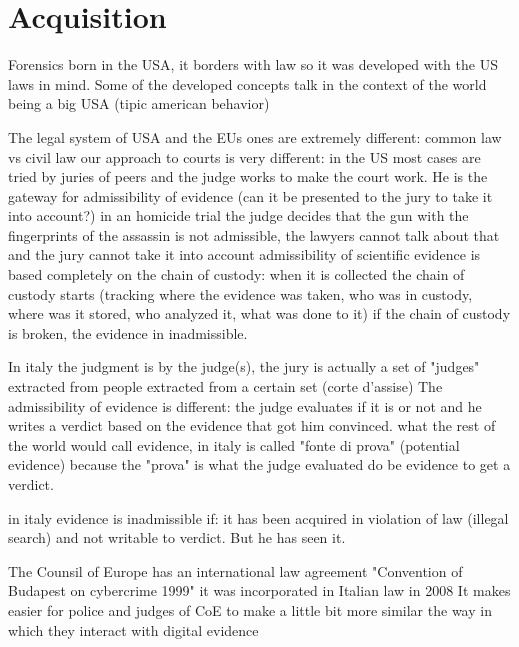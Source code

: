 \chapter{Acquisition}
    Forensics born in the USA, it borders with law so it was developed with the US laws in mind.
    Some of the developed concepts talk in the context of the world being a big USA (tipic american behavior)

    The legal system of USA and the EUs ones are extremely different:
        common law vs civil law 
        our approach to courts is very different:
            in the US most cases are tried by juries of peers and the judge works to make the court work. He is the gateway for admissibility of evidence (can it be presented to the jury to take it into account?)
            in an homicide trial the judge decides that the gun with the fingerprints of the assassin is not admissible, the lawyers cannot talk about that and the jury cannot take it into account 
            admissibility of scientific evidence is based completely on the chain of custody:
                when it is collected the chain of custody starts (tracking where the evidence was taken, who was in custody, where was it stored, who analyzed it, what was done to it)
                if the chain of custody is broken, the evidence in inadmissible.
    
    In italy the judgment is by the judge(s), the jury is actually a set of "judges" extracted from people extracted from a certain set (corte d'assise)
    The admissibility of evidence is different:
        the judge evaluates if it is or not and he writes a verdict based on the evidence that got him convinced.
        what the rest of the world would call evidence, in italy is called "fonte di prova" (potential evidence) because the "prova" is what the judge evaluated do be evidence to get a verdict.
        
        in italy evidence is inadmissible if:
            it has been acquired in violation of law (illegal search) and not writable to verdict. But he has seen it.

    The Counsil of Europe has an international law agreement "Convention of Budapest on cybercrime 1999"
    it was incorporated in Italian law in 2008 
    It makes easier for police and judges of CoE to make a little bit more similar the way in which they interact with digital evidence

